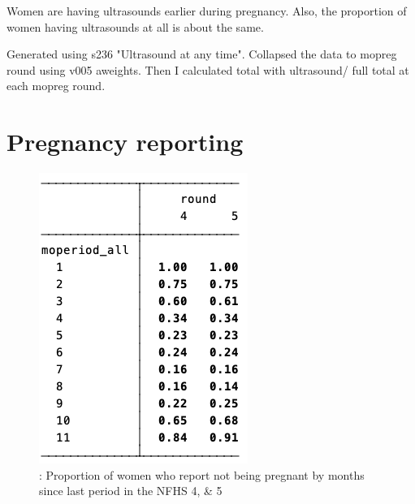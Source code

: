 \documentclass{article}
\begin{document}
Women are having ultrasounds earlier during pregnancy. Also, the proportion of women having ultrasounds at all is about the same.

Generated using s236 "Ultrasound at any time".
Collapsed the data to mopreg round using v005 aweights. 
Then I calculated total with ultrasound/ full total at each mopreg round.

\section{Pregnancy reporting}

\begin{figure}[H]
    \centering
    \includegraphics[width=\textwidth]{tables/says pregnant by gestational duration.png}
    \caption{: Proportion of women who report not being pregnant by months since last period in the NFHS 4, \& 5}
\end{figure}
\end{document}
